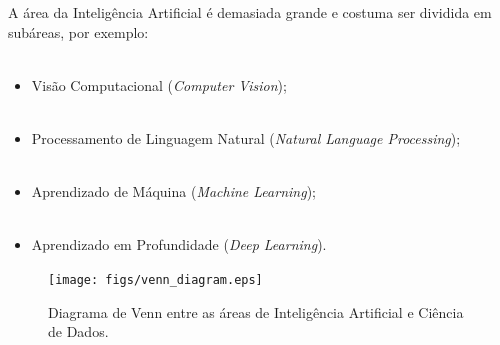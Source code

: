 \begin{frame}
	A área da Inteligência Artificial é demasiada grande e costuma ser dividida em subáreas, por exemplo:
	\\~\\
	\begin{itemize}
		\justifying
		\item Visão Computacional (\emph{Computer Vision});
		\\~\\
		\item Processamento de Linguagem Natural (\emph{Natural Language Processing});
		\\~\\
		\item Aprendizado de Máquina (\emph{Machine Learning});
		\\~\\
		\item Aprendizado em Profundidade (\emph{Deep Learning}).	
	\end{itemize}
\end{frame}

\begin{frame}
	\begin{figure}[!ht]
		\centering
		\texttt{[image: figs/venn\_diagram.eps]}	
		\label{f.venn_diagram}
		\caption{Diagrama de Venn entre as áreas de Inteligência Artificial e Ciência de Dados.}
	\end{figure}
\end{frame}